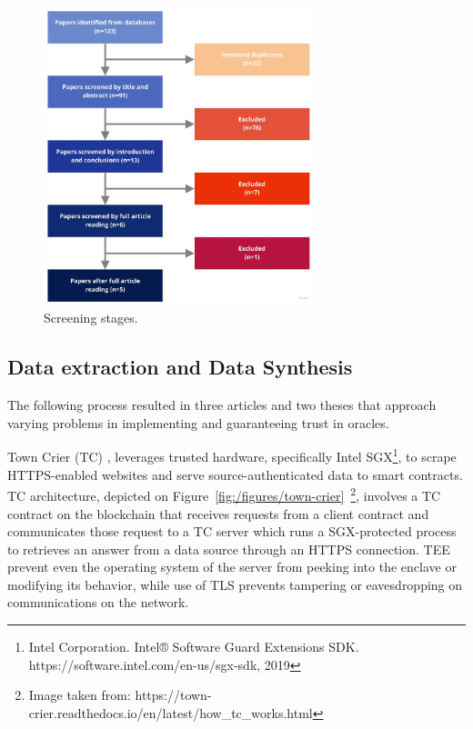 \begin{figure}[H]
  \begin{center}
    \leavevmode
    \includegraphics[width=0.7\textwidth]{figures/paper-screening.jpg}
    \caption{Screening stages.}
    \label{fig:/figures/paper-screening}
  \end{center}
\end{figure}

\subsection{Data extraction and Data Synthesis}


The following process resulted in three articles and two theses that approach varying problems in implementing and guaranteeing trust in oracles.

Town Crier (TC) \citet{Zhang2016a}, leverages trusted hardware, specifically Intel SGX\footnote{Intel Corporation. Intel® Software Guard Extensions SDK. https://software.intel.com/en-us/sgx-sdk, 2019}, to scrape HTTPS-enabled websites and serve source-authenticated data to smart contracts. TC architecture, depicted on Figure~\ref{fig:/figures/town-crier}~\footnote{Image taken from: https://town-crier.readthedocs.io/en/latest/how\_tc\_works.html}, involves a TC contract on the blockchain that receives requests from a client contract and communicates those request to a TC server which runs a SGX-protected process to retrieves an answer from a data source through an HTTPS connection. TEE prevent even the operating system of the server from peeking into the enclave or modifying its behavior, while use of TLS prevents tampering or eavesdropping on communications on the network.

